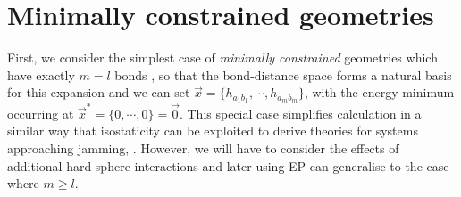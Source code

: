 \documentclass[11pt,twoside]{report}
\begin{document}




\section{Minimally constrained geometries}
\label{sec:no-ep-integration}

First, we consider the simplest case of \emph{minimally constrained} geometries which have exactly $m = l$ bonds%
,
so that the bond-distance space forms a natural basis for this expansion and we can set $\vec{x} = \{h_{a_1 b_1}, \cdots, h_{a_m b_m}\}$, with the energy minimum occurring at $\vec{x}^* = \{0, \cdots, 0\} = \vec{0}$.
This special case simplifies calculation in a similar way that isostaticity can be exploited to derive theories for systems approaching jamming, \cite{WyartAP2005,BritoEEL2006}.
However, we will have to consider the effects of additional hard sphere interactions and later using EP can generalise to the case where $m \ge l$.
\end{document}
